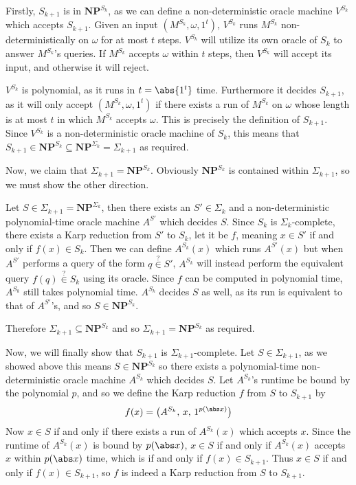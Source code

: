 \documentclass[10pt]{article}
\def\NP{\mathbf{NP}}
\begin{document}
Firstly, $S_{k+1}$ is in $\NP^{S_k}$, as we can define a non-deterministic oracle machine $V^{S_k}$ which accepts $S_{k+1}$.
Given an input $(M^{S_k},\omega,1^t)$, $V^{S_k}$ runs $M^{S_k}$ non-deterministically on $\omega$ for at most $t$ steps.
$V^{S_k}$ will utilize its own oracle of $S_k$ to answer $M^{S_k}$'s queries.
If $M^{S_k}$ accepts $\omega$ within $t$ steps, then $V^{S_k}$ will accept its input, and otherwise it will reject.

$V^{S_k}$ is polynomial, as it runs in $t=\abs{1^t}$ time.
Furthermore it decides $S_{k+1}$, as it will only accept $(M^{S_k},\omega,1^t)$ if there exists a run of $M^{S_k}$ on $\omega$ whose length is at most $t$ in which $M^{S_k}$ accepts $\omega$.
This is precisely the definition of $S_{k+1}$.
Since $V^{S_k}$ is a non-deterministic oracle machine of $S_k$, this means that $S_{k+1}\in\NP^{S_k}\subseteq\NP^{\Sigma_k}=\Sigma_{k+1}$ as required.

Now, we claim that $\Sigma_{k+1}=\NP^{S_k}$.
Obviously $\NP^{S_k}$ is contained within $\Sigma_{k+1}$, so we must show the other direction.

Let $S\in\Sigma_{k+1}=\NP^{\Sigma_k}$, then there exists an $S'\in\Sigma_k$ and a non-deterministic polynomial-time oracle machine $A^{S'}$ which decides $S$.
Since $S_k$ is $\Sigma_k$-complete, there exists a Karp reduction from $S'$ to $S_k$, let it be $f$, meaning $x\in S'$ if and only if $f(x)\in S_k$.
Then we can define $A^{S_k}(x)$ which runs $A^{S'}(x)$ but when $A^{S'}$ performs a query of the form $q\mathrel{\mathop\in\limits^{\scriptscriptstyle?}}S'$, $A^{S_k}$ will instead perform the equivalent
query $f(q)\mathrel{\mathop\in\limits^{\scriptscriptstyle?}}S_k$ using its oracle.
Since $f$ can be computed in polynomial time, $A^{S_k}$ still takes polynomial time.
$A^{S_k}$ decides $S$ as well, as its run is equivalent to that of $A^{S'}$'s, and so $S\in\NP^{S_k}$.

Therefore $\Sigma_{k+1}\subseteq\NP^{S_k}$ and so $\Sigma_{k+1}=\NP^{S_k}$ as required.

Now, we will finally show that $S_{k+1}$ is $\Sigma_{k+1}$-complete.
Let $S\in\Sigma_{k+1}$, as we showed above this means $S\in\NP^{S_k}$ so there exists a polynomial-time non-deterministic oracle machine $A^{S_k}$ which decides $S$.
Let $A^{S_k}$'s runtime be bound by the polynomial $p$, and so we define the Karp reduction $f$ from $S$ to $S_{k+1}$ by
\[ f(x) = \bigl(A^{S_k},\,x,\,1^{p(\abs x)}\bigr) \]
Now $x\in S$ if and only if there exists a run of $A^{S_k}(x)$ which accepts $x$.
Since the runtime of $A^{S_k}(x)$ is bound by $p(\abs x)$, $x\in S$ if and only if $A^{S_k}(x)$ accepts $x$ within $p(\abs x)$ time, which is if and only if $f(x)\in S_{k+1}$.
Thus $x\in S$ if and only if $f(x)\in S_{k+1}$, so $f$ is indeed a Karp reduction from $S$ to $S_{k+1}$.
\end{document}
